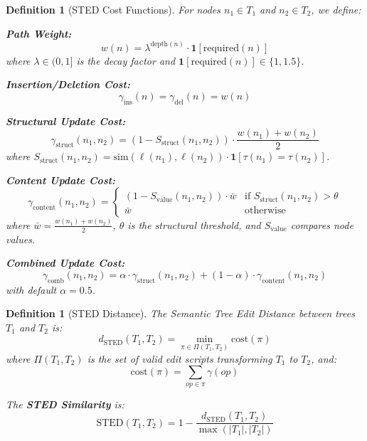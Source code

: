 \documentclass{article}
\newtheorem{definition}[theorem]{Definition}
\begin{document}
\begin{definition}[STED Cost Functions]
\label{def:cost-functions}
For nodes $n_1 \in T_1$ and $n_2 \in T_2$, we define:

\textbf{Path Weight:}
\begin{equation}
    w(n) = \lambda^{\text{depth}(n)} \cdot \mathbf{1}[\text{required}(n)]
\end{equation}
where $\lambda \in (0, 1]$ is the decay factor and $\mathbf{1}[\text{required}(n)] \in \{1, 1.5\}$.

\textbf{Insertion/Deletion Cost:}
\begin{equation}
    \gamma_{\text{ins}}(n) = \gamma_{\text{del}}(n) = w(n)
\end{equation}

\textbf{Structural Update Cost:}
\begin{equation}
    \gamma_{\text{struct}}(n_1, n_2) = (1 - S_{\text{struct}}(n_1, n_2)) \cdot \frac{w(n_1) + w(n_2)}{2}
\end{equation}
where $S_{\text{struct}}(n_1, n_2) = \text{sim}(\ell(n_1), \ell(n_2)) \cdot \mathbf{1}[\tau(n_1) = \tau(n_2)]$.

\textbf{Content Update Cost:}
\begin{equation}
    \gamma_{\text{content}}(n_1, n_2) = \begin{cases}
        (1 - S_{\text{value}}(n_1, n_2)) \cdot \bar{w} & \text{if } S_{\text{struct}}(n_1, n_2) > \theta \\
        \bar{w} & \text{otherwise}
    \end{cases}
\end{equation}
where $\bar{w} = \frac{w(n_1) + w(n_2)}{2}$, $\theta$ is the structural threshold, and $S_{\text{value}}$ compares node values.

\textbf{Combined Update Cost:}
\begin{equation}
    \gamma_{\text{comb}}(n_1, n_2) = \alpha \cdot \gamma_{\text{struct}}(n_1, n_2) + (1-\alpha) \cdot \gamma_{\text{content}}(n_1, n_2)
\end{equation}
with default $\alpha = 0.5$.
\end{definition}

\begin{definition}[STED Distance]
\label{def:sted}
The Semantic Tree Edit Distance between trees $T_1$ and $T_2$ is:
\begin{equation}
    d_{\text{STED}}(T_1, T_2) = \min_{\pi \in \Pi(T_1, T_2)} \text{cost}(\pi)
\end{equation}
where $\Pi(T_1, T_2)$ is the set of valid edit scripts transforming $T_1$ to $T_2$, and:
\begin{equation}
    \text{cost}(\pi) = \sum_{op \in \pi} \gamma(op)
\end{equation}

The \textbf{STED Similarity} is:
\begin{equation}
    \text{STED}(T_1, T_2) = 1 - \frac{d_{\text{STED}}(T_1, T_2)}{\max(|T_1|, |T_2|)}
\end{equation}
\end{definition}
\end{document}
